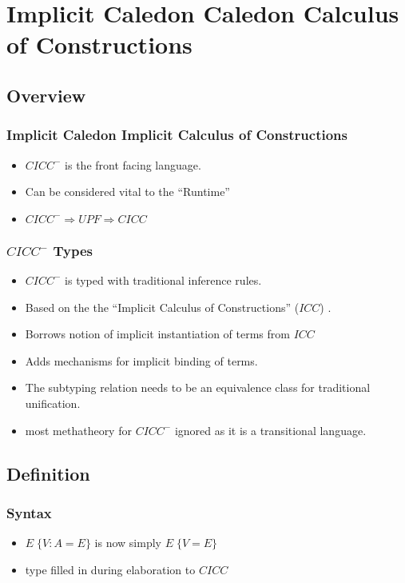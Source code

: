 \section[$CICC^-$]{Implicit Caledon Caledon Calculus of Constructions}

\subsection{Overview}

\begin{frame}
\frametitle{Implicit Caledon Implicit Calculus of Constructions}
\begin{itemize}
\item $CICC^-$ is the front facing language.
\item Can be considered vital to the ``Runtime''
\item $CICC^- \Rightarrow UPF \Rightarrow CICC$
\end{itemize}
\end{frame}


\begin{frame}
\frametitle{$CICC^-$ Types}
\begin{itemize}
\item $CICC^-$ is typed with traditional inference rules.
\item Based on the the ``Implicit Calculus of Constructions'' ($ICC$) \citep{miquel2001implicit}.
\item Borrows notion of implicit instantiation of terms from $ICC$
\item Adds mechanisms for implicit binding of terms. 
\item The subtyping relation needs to be an equivalence class for traditional unification.
\item most methatheory for $CICC^-$ ignored as it is a transitional language.
\end{itemize}
\end{frame}


\subsection{Definition}

\begin{frame}
\frametitle{Syntax}

\begin{itemize}
\item $E\; \{ V : A = E \}$ is now simply $ E \; \{ V  = E \}$
\item type filled in during elaboration to $CICC$
\end{itemize}

\end{frame}


